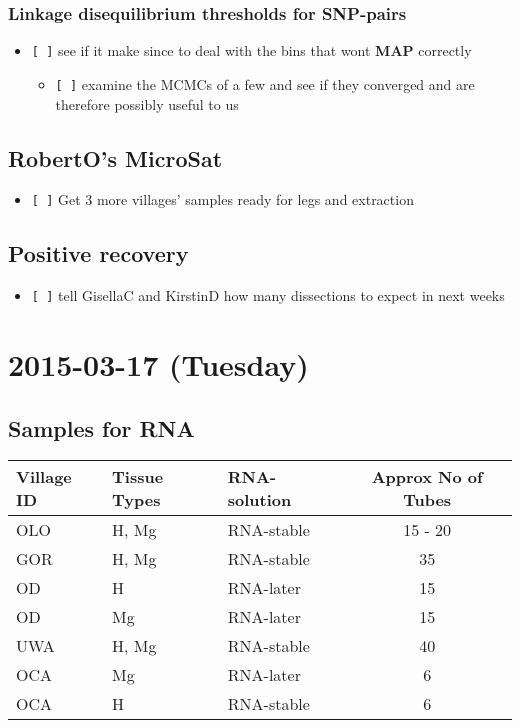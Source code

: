 \documentclass[letterpaper]{scrartcl}
\begin{document}
\subsubsection{Linkage disequilibrium thresholds for
SNP-pairs}\label{linkage-disequilibrium-thresholds-for-snp-pairs-1}

\begin{itemize}
\itemsep1pt\parskip0pt
\item
  \texttt{{[} {]}} see if it make since to deal with the bins that wont
  \textbf{MAP} correctly

  \begin{itemize}
  \itemsep1pt\parskip0pt
  \item
    \texttt{{[} {]}} examine the MCMCs of a few and see if they
    converged and are therefore possibly useful to us
  \end{itemize}
\end{itemize}

\subsection{RobertO's MicroSat}\label{robertos-microsat-3}

\begin{itemize}
\itemsep1pt\parskip0pt
\item
  \texttt{{[} {]}} Get 3 more villages' samples ready for legs and
  extraction
\end{itemize}

\subsection{Positive recovery}\label{positive-recovery-1}

\begin{itemize}
\itemsep1pt\parskip0pt
\item
  \texttt{{[} {]}} tell GisellaC and KirstinD how many dissections to
  expect in next weeks
\end{itemize}

\section{2015-03-17 (Tuesday)}\label{tuesday}

\subsection{Samples for RNA}\label{samples-for-rna}

\begin{longtable}[c]{@{}lllc@{}}
\toprule
Village ID & Tissue Types & RNA-solution & Approx No of
Tubes\tabularnewline
\midrule
\endhead
OLO & H, Mg & RNA-stable & 15 - 20\tabularnewline
GOR & H, Mg & RNA-stable & 35\tabularnewline
OD & H & RNA-later & 15\tabularnewline
OD & Mg & RNA-later & 15\tabularnewline
UWA & H, Mg & RNA-stable & 40\tabularnewline
OCA & Mg & RNA-later & 6\tabularnewline
OCA & H & RNA-stable & 6\tabularnewline
\bottomrule
\end{longtable}
\end{document}
